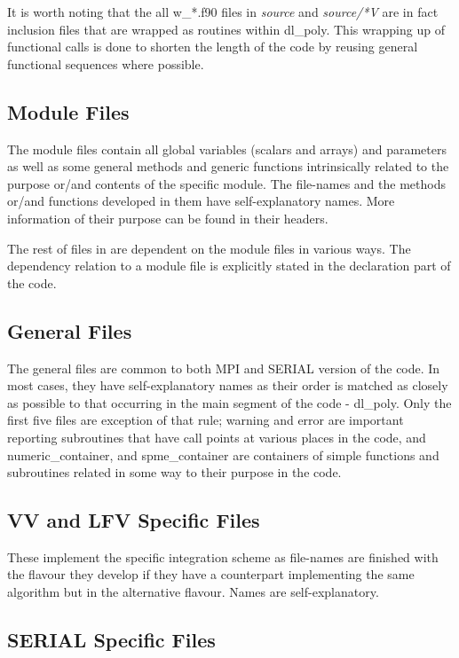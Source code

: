 It is worth noting that the all {\sc w\_*.f90} files in {\em source} and
{\em source/*V} are in fact inclusion files that are wrapped as routines
within {\sc dl\_poly}.  This wrapping up of functional calls is done to
shorten the length of the code by reusing general functional sequences
where possible.

\subsection{Module Files}

The \D module files contain all global variables (scalars and
arrays) and parameters as well as some general methods and generic
functions intrinsically related to the purpose or/and contents of
the specific module.  The file-names and the methods or/and
functions developed in them have self-explanatory names.  More
information of their purpose can be found in their headers.

The rest of files in \D are dependent on the module files in
various ways.  The dependency relation to a module file is
explicitly stated in the declaration part of the code.

\subsection{General Files}

The \D general files are common to both MPI and SERIAL version of
the code.  In most cases, they have self-explanatory names as their
order is matched as closely as possible to that occurring in the
main segment of the code - {\sc dl\_poly}.  Only the first five
files are exception of that rule; {\sc warning} and {\sc error} are
important reporting subroutines that have call points at various
places in the code, and {\sc numeric\_container}, and
{\sc spme\_container} are containers of simple functions and
subroutines related in some way to their purpose in the code.

\subsection{VV and LFV Specific Files}

These implement the specific integration scheme as file-names are
finished with the flavour they develop if they have a counterpart
implementing the same algorithm but in the alternative flavour.
Names are self-explanatory.

\subsection{SERIAL Specific Files}

